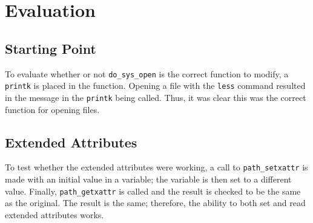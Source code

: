 \section{Evaluation}

\subsection*{Starting Point}

To evaluate whether or not \texttt{do\_sys\_open} is the correct function to modify, a \texttt{printk} is placed in the function. Opening a file with the \texttt{less} command resulted in the message in the \texttt{printk} being called. Thus, it was clear this was the correct function for opening files.

\subsection*{Extended Attributes}

To test whether the extended attributes were working, a call to \texttt{path\_setxattr} is made with an initial value in a variable; the variable is then set to a different value. Finally, \texttt{path\_getxattr} is called and the result is checked to be the same as the original. The result is the same; therefore, the ability to both set and read extended attributes works.
